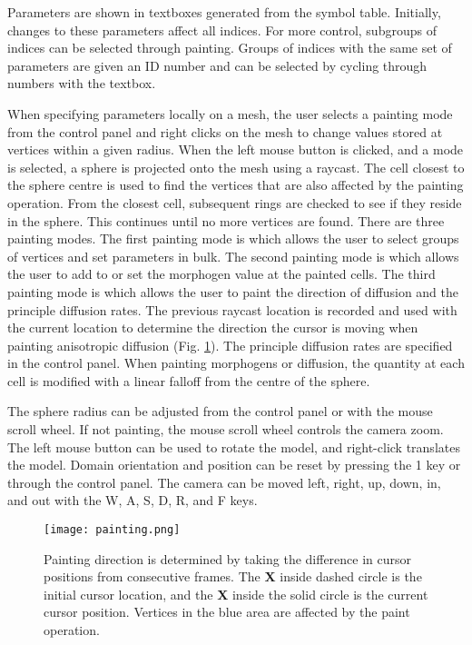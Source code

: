 Parameters are shown in textboxes generated from the symbol table. Initially, changes to these parameters affect all indices. For more control, subgroups of indices can be selected through painting. Groups of indices with the same set of parameters are given an ID number and can be selected by cycling through numbers with the  textbox. 

When specifying parameters locally on a mesh, the user selects a painting mode from the control panel and right clicks on the mesh to change values stored at vertices within a given radius. When the left mouse button is clicked, and a mode is selected, a sphere is projected onto the mesh using a raycast. The cell closest to the sphere centre is used to find the vertices that are also affected by the painting operation. From the closest cell, subsequent rings are checked to see if they reside in the sphere. This continues until no more vertices are found. There are three painting modes. The first painting mode is  which allows the user to select groups of vertices and set parameters in bulk. The second painting mode is  which allows the user to add to or set the morphogen value at the painted cells. The third painting mode is  which allows the user to paint the direction of diffusion and the principle diffusion rates. The previous raycast location is recorded and used with the current location to determine the direction the cursor is moving when painting anisotropic diffusion (Fig. \ref{fig:painting}). The principle diffusion rates are specified in the control panel. When painting morphogens or diffusion, the quantity at each cell is modified with a linear falloff from the centre of the sphere.

The sphere radius can be adjusted from the control panel or with the mouse scroll wheel. If not painting, the mouse scroll wheel controls the camera zoom. The left mouse button can be used to rotate the model, and right-click translates the model. Domain orientation and position can be reset by pressing the 1 key or through the control panel. The camera can be moved left, right, up, down, in, and out with the W, A, S, D, R, and F keys.

\begin{figure}[ht]
	\centering
	\texttt{[image: painting.png]}	
	\caption{Painting direction is determined by taking the difference in cursor positions from consecutive frames. The \textbf{X} inside dashed circle is the initial cursor location, and the \textbf{X} inside the solid circle is the current cursor position. Vertices in the blue area are affected by the paint operation.} 
	\label{fig:painting}
\end{figure}

